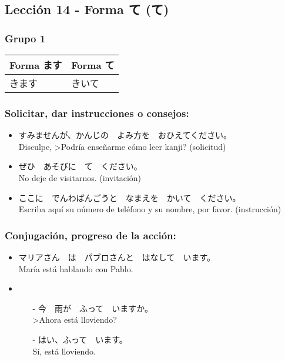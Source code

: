 \documentclass[a4paper,12pt,oneside]{report}
\def\bv{\textbf{V}} %
\begin{document}
\begin{CJK*}{UTF8}{min}
    \section{Lección 14 - Forma て (て)}

        \subsubsection{Grupo 1}
        \begin{tabular}{ | l | l | }
          \hline
          \cellcolor[gray]{0.9} Forma ます & \cellcolor[gray]{0.9} Forma て\\
          \hline
          きます　& きいて\\
          \hline
        \end{tabular}

      \subsubsection{Solicitar, dar instrucciones o consejos:}
        \fbox{\bv(て) + ください}

        \begin{itemize}
          \item すみませんが、かんじの　よみ方を　おひえてください。\\
                Disculpe, >Podr\'ia enseñarme c\'omo leer kanji? (solicitud)
          \item ぜひ　あそびに　て　ください。\\
                No deje de visitarnos. (invitaci\'on)
          \item ここに　でんわばんごうと　なまえを　かいて　ください。\\
                Escriba aqu\'i su n\'umero de tel\'efono y su nombre, por favor. (instrucci\'on)
        \end{itemize}

      \subsubsection{Conjugaci\'on, progreso de la acci\'on:}
        \fbox{\bv(て) + います}

        \begin{itemize}
          \item マリアさん　は　パブロさんと　はなして　います。\\
                Mar\'ia est\'a hablando con Pablo.
          \item
            \begin{itemize}
              \item[-] 今　雨が　ふって　いますか。\\
                       >Ahora est\'a lloviendo?
              \item[-] はい、ふって　います。\\
                       S\'i, est\'a lloviendo.
            \end{itemize}
        \end{itemize}


\end{CJK*}
\end{document}
